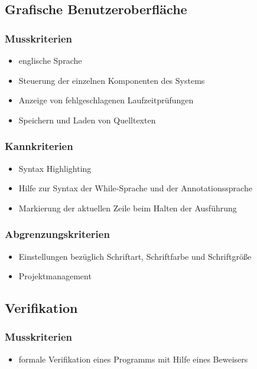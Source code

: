 \documentclass[a4paper,10pt]{article}
\begin{document}
\subsection{Grafische Benutzeroberfl\"{a}che}
\subsubsection{Musskriterien}
\begin{itemize}
  \item englische Sprache
  \item Steuerung der einzelnen Komponenten des Systems
  \item Anzeige von fehlgeschlagenen Laufzeitpr\"{u}fungen
  \item Speichern und Laden von Quelltexten
\end{itemize}
\subsubsection{Kannkriterien}
\begin{itemize}
  \item Syntax Highlighting
  \item Hilfe zur Syntax der While-Sprache und der Annotationssprache
  \item Markierung der aktuellen Zeile beim Halten der Ausf\"{u}hrung
\end{itemize}
\subsubsection{Abgrenzungskriterien}
\begin{itemize}
  \item Einstellungen bezüglich Schriftart, Schriftfarbe und Schriftgröße
  \item Projektmanagement
\end{itemize}

\subsection{Verifikation}
\subsubsection{Musskriterien}
\begin{itemize}
  \item formale Verifikation eines Programms mit Hilfe eines Beweisers
\end{itemize}
\end{document}
